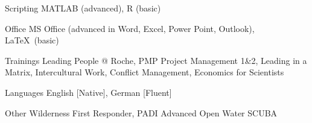 


\begin{cvskills}


\cvskill
{Scripting} %
{MATLAB (advanced), R (basic)} %



\cvskill
{Office} %
{MS Office (advanced in Word, Excel, Power Point, Outlook), \LaTeX\ (basic)} %

\cvskill
{Trainings} %
{Leading People @ Roche, PMP Project Management 1\&2, Leading in a Matrix, Intercultural Work, Conflict Management, Economics for Scientists} %



\cvskill
{Languages} %
{English [Native], German [Fluent]} %


\cvskill
{Other} %
{Wilderness First Responder, PADI Advanced Open Water SCUBA} %




\end{cvskills}